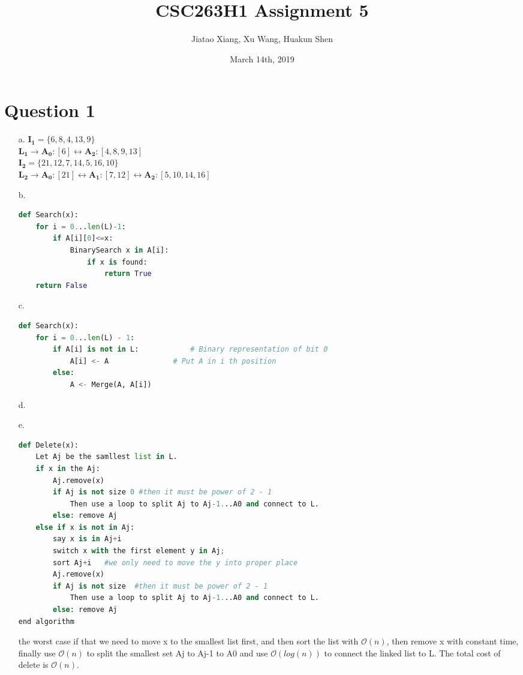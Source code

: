 \documentclass[10pt]{article}
\title{CSC263H1 Assignment 5}
\author{Jiatao Xiang, Xu Wang, Huakun Shen}
\date{March 14th, 2019}
\begin{document}
\lstset{style=mystyle}
\maketitle
\section*{Question 1}
\begin{itemize}
\item[a.]
$\boldsymbol{I_1}=\{6,8,4,13,9\}$\\
$\boldsymbol{L_1}\rightarrow \boldsymbol{A_0}:[6]\leftrightarrow \boldsymbol{A_2}:[4,8,9,13]$\\
$\boldsymbol{I_2}=\{21,12,7,14,5,16,10\}$\\
$\boldsymbol{L_2}\rightarrow \boldsymbol{A_0}:[21]\leftrightarrow \boldsymbol{A_1}:[7,12]\leftrightarrow \boldsymbol{A_2}:[5,10,14,16]$
\item[b.]
\begin{lstlisting}[language=Python]
def Search(x):
	for i = 0...len(L)-1:
		if A[i][0]<=x:
			BinarySearch x in A[i]:
				if x is found:
					return True
	return False
\end{lstlisting}
\item[c.]
\begin{lstlisting}[language=Python]
def Search(x):
	for i = 0...len(L) - 1:
		if A[i] is not in L:			# Binary representation of bit 0
			A[i] <- A				# Put A in i th position
		else:
			A <- Merge(A, A[i])
\end{lstlisting}
\item[d.]
\item[e.]
\begin{lstlisting}[language=Python]
def Delete(x):
	Let Aj be the samllest list in L.
	if x in the Aj:
		Aj.remove(x)
		if Aj is not size 0 #then it must be power of 2 - 1
			Then use a loop to split Aj to Aj-1...A0 and connect to L.
		else: remove Aj
	else if x is not in Aj:
		say x is in Aj+i
		switch x with the first element y in Aj;
		sort Aj+i   #we only need to move the y into proper place
		Aj.remove(x)
		if Aj is not size  #then it must be power of 2 - 1
			Then use a loop to split Aj to Aj-1...A0 and connect to L.
		else: remove Aj
end algorithm
\end{lstlisting}
the worst case if that we need to move x to the smallest list first, and then sort the list with $\mathcal{O}(n)$, then remove x with constant time, finally use $\mathcal{O}(n)$ to split the smallest set  Aj to Aj-1 to A0 and use $\mathcal{O}(log(n))$ to connect the linked list to L. The total cost of delete is $\mathcal{O}(n)$.
\end{itemize}
\end{document}
